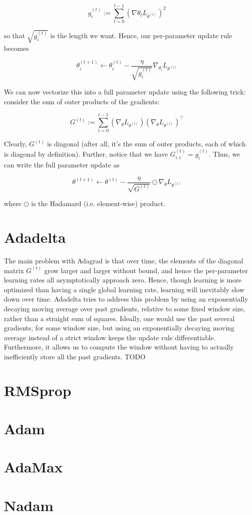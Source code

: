 \documentclass{article}
\begin{document}
    $$ g^{(t)}_i := \sum_{t = 0}^{t - 1} \left( \nabla \theta_t L_{\theta^{(t)}} \right)^2 $$

so that $ \sqrt{g^{(t)}_i} $ is the length we want. Hence, our per-parameter update rule becomes

    $$ \theta^{(t + 1)}_i \gets \theta^{(t)}_i - \frac{\eta}{\sqrt{g^{(t)}_i}} \nabla_{\theta_i} L_{\theta^{(t)}} $$

We can now vectorize this into a full parameter update using the following trick: consider the sum of outer products of the gradients:

    $$ G^{(t)} := \sum_{t = 0}^{t - 1} \left( \nabla_\theta L_{\theta^{(t)}} \right) \left( \nabla_\theta L_{\theta^{(t)}} \right)^\intercal $$

Clearly, $ G^{(t)} $ is diagonal (after all, it's the sum of outer products, each of which is diagonal by definition). Further, notice that we have $ G^{(t)}_{i, i} = g^{(t)}_i $. Thus, we can write the full parameter update as

    $$ \theta^{(t + 1)} \gets \theta^{(t)} - \frac{\eta}{\sqrt{G^{(t)}}} \odot \nabla_\theta L_{\theta^{(t)}} $$

where $ \odot $ is the Hadamard (i.e. element-wise) product.

\section{Adadelta}
The main problem with Adagrad is that over time, the elements of the diagonal matrix $ G^{(t)} $ grow larger and larger without bound, and hence the per-parameter learning rates all asymptotically approach zero. Hence, though learning is more optimized than having a single global learning rate, learning will inevitably slow down over time. Adadelta tries to address this problem by using an exponentially decaying moving average over past gradients, relative to some fixed window size, rather than a straight sum of squares. Ideally, one would use the past several gradients, for some window size, but using an exponentially decaying moving average instead of a strict window keeps the update rule differentiable. Furthermore, it allows us to compute the window without having to actually inefficiently store all the past gradients. TODO

\section{RMSprop}

\section{Adam}

\section{AdaMax}

\section{Nadam}
\end{document}
